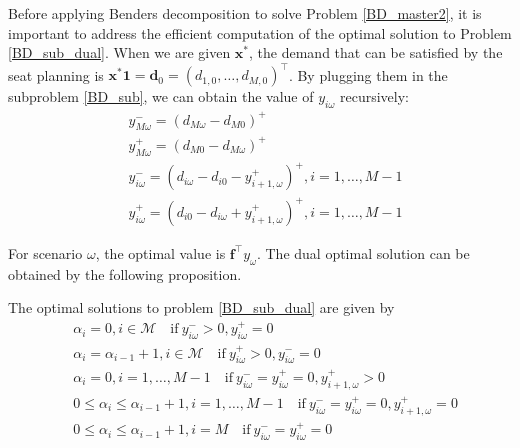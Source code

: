 



Before applying Benders decomposition to solve Problem \eqref{BD_master2}, it is important to address the efficient computation of the optimal solution to Problem \eqref{BD_sub_dual}.
When we are given $\mathbf{x}^{*}$, the demand that can be satisfied by the seat planning is $\mathbf{x}^{*} \mathbf{1} = \mathbf{d}_0 = (d_{1,0},\ldots,d_{M,0})^{\intercal}$.
By plugging them in the subproblem \eqref{BD_sub}, we can obtain the value of $y_{i \omega}$ recursively:
\begin{equation}\label{y_recursively}
\begin{aligned}
  & y_{M \omega}^{-}=\left(d_{M \omega}-d_{M 0}\right)^{+} \\
  & y_{M \omega}^{+}=\left(d_{M 0}-d_{M \omega}\right)^{+} \\
  & y_{i \omega}^{-}=\left(d_{i \omega}-d_{i 0} - y_{i+1, \omega}^{+} \right)^{+}, i =1,\ldots, M-1 \\
  & y_{i \omega}^{+}=\left(d_{i 0}- d_{i \omega} + y_{i+1, \omega}^{+}\right)^{+}, i =1,\ldots, M-1
\end{aligned}
\end{equation}

For scenario $\omega$, the optimal value is $\mathbf{f}^{\intercal} y_{\omega}$. The dual optimal solution can be obtained by the following proposition.

\begin{prop}\label{optimal_sol_sub_dual}
  The optimal solutions to problem \eqref{BD_sub_dual} are given by 
\begin{equation}\label{BD_sub_simplified}
  \begin{aligned}
    & \alpha_{i} = 0, i \in \mathcal{M} \quad \text{if}~  y_{i \omega}^{-} > 0,  y_{i \omega}^{+} = 0   \\
    & \alpha_{i} = \alpha_{i-1}+1, i \in \mathcal{M} \quad \text{if}~ y_{i \omega}^{+} > 0,  y_{i \omega}^{-} = 0 \\
    & \alpha_{i} = 0, i =1,\ldots, M-1 \quad \text{if}~ y_{i \omega}^{-} = y_{i \omega}^{+} = 0, y_{i+1, \omega}^{+}> 0 \\
    & 0 \leq \alpha_{i} \leq \alpha_{i-1}+1, i =1,\ldots, M-1 \quad \text{if}~ y_{i \omega}^{-} = y_{i \omega}^{+} = 0, y_{i+1, \omega}^{+}= 0 \\
    & 0 \leq \alpha_{i} \leq \alpha_{i-1}+1, i = M \quad \text{if}~ y_{i \omega}^{-} = y_{i \omega}^{+} = 0
  \end{aligned}
\end{equation}
\end{prop}

